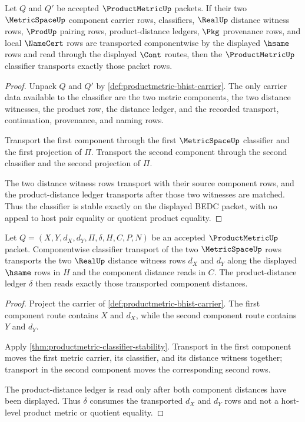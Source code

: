 \begin{theorem}
\label{thm:productmetric-classifier-stability}
Let $Q$ and $Q'$ be accepted $\ProductMetricUp$ packets. If their two $\MetricSpaceUp$ component carrier rows, classifiers, $\RealUp$ distance witness rows, $\ProdUp$ pairing rows, product-distance ledgers, $\Pkg$ provenance rows, and local $\NameCert$ rows are transported componentwise by the displayed $\hsame$ rows and read through the displayed $\Cont$ routes, then the $\ProductMetricUp$ classifier transports exactly those packet rows.
\end{theorem}
\begin{proof}
Unpack $Q$ and $Q'$ by \autoref{def:productmetric-bhist-carrier}. The only carrier data available to the classifier are the two metric components, the two distance witnesses, the product row, the distance ledger, and the recorded transport, continuation, provenance, and naming rows.

Transport the first component through the first $\MetricSpaceUp$ classifier and the first projection of $\Pi$. Transport the second component through the second classifier and the second projection of $\Pi$.

The two distance witness rows transport with their source component rows, and the product-distance ledger transports after those two witnesses are matched. Thus the classifier is stable exactly on the displayed BEDC packet, with no appeal to host pair equality or quotient product equality.
\end{proof}

\begin{theorem}
\label{thm:productmetric-component-distance-transport}
Let $Q=(X,Y,d_X,d_Y,\Pi,\delta,H,C,P,N)$ be an accepted $\ProductMetricUp$ packet. Componentwise classifier transport of the two $\MetricSpaceUp$ rows transports the two $\RealUp$ distance witness rows $d_X$ and $d_Y$ along the displayed $\hsame$ rows in $H$ and the component distance reads in $C$. The product-distance ledger $\delta$ then reads exactly those transported component distances.
\end{theorem}
\begin{proof}
Project the carrier of \autoref{def:productmetric-bhist-carrier}. The first component route contains $X$ and $d_X$, while the second component route contains $Y$ and $d_Y$.

Apply \autoref{thm:productmetric-classifier-stability}. Transport in the first component moves the first metric carrier, its classifier, and its distance witness together; transport in the second component moves the corresponding second rows.

The product-distance ledger is read only after both component distances have been displayed. Thus $\delta$ consumes the transported $d_X$ and $d_Y$ rows and not a host-level product metric or quotient equality.
\end{proof}

